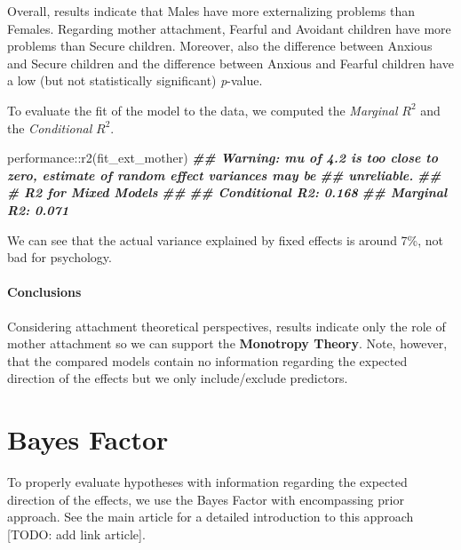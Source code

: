 \documentclass[
]{book}
\newenvironment{Shaded}{\begin{snugshade}}{\end{snugshade}}
\newcommand{\DocumentationTok}[1]{\textcolor[rgb]{0.56,0.35,0.01}{\textbf{\textit{#1}}}}
\newcommand{\FunctionTok}[1]{\textcolor[rgb]{0.00,0.00,0.00}{#1}}
\newcommand{\NormalTok}[1]{#1}
\newcommand{\SpecialCharTok}[1]{\textcolor[rgb]{0.00,0.00,0.00}{#1}}
\begin{document}
Overall, results indicate that Males have more externalizing problems than Females. Regarding mother attachment, Fearful and Avoidant children have more problems than Secure children. Moreover, also the difference between Anxious and Secure children and the difference between Anxious and Fearful children have a low (but not statistically significant) \emph{p}-value.

To evaluate the fit of the model to the data, we computed the \emph{Marginal} \(R^2\) and the \emph{Conditional} \(R^2\).

\begin{Shaded}
\begin{Highlighting}[]
\NormalTok{performance}\SpecialCharTok{::}\FunctionTok{r2}\NormalTok{(fit\_ext\_mother)}
\DocumentationTok{\#\# Warning: mu of 4.2 is too close to zero, estimate of random effect variances may be}
\DocumentationTok{\#\#   unreliable.}
\DocumentationTok{\#\# \# R2 for Mixed Models}
\DocumentationTok{\#\# }
\DocumentationTok{\#\#   Conditional R2: 0.168}
\DocumentationTok{\#\#      Marginal R2: 0.071}
\end{Highlighting}
\end{Shaded}

We can see that the actual variance explained by fixed effects is around 7\%, not bad for psychology.

\hypertarget{conclusions-1}{%
\subsubsection*{Conclusions}\label{conclusions-1}}

Considering attachment theoretical perspectives, results indicate only the role of mother attachment so we can support the \textbf{Monotropy Theory}. Note, however, that the compared models contain no information regarding the expected direction of the effects but we only include/exclude predictors.

\hypertarget{BF-ext}{%
\chapter{Bayes Factor}\label{BF-ext}}

To properly evaluate hypotheses with information regarding the expected direction of the effects, we use the Bayes Factor with encompassing prior approach. See the main article for a detailed introduction to this approach {[}TODO: add link article{]}.
\end{document}
